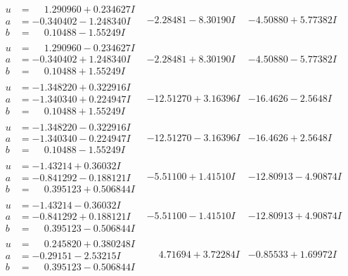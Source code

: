 \documentclass[1p]{elsarticle_modified}
\theoremstyle{definition}
\begin{document}
$$\begin{array}{c|c|c}
\begin{aligned}
u &= \phantom{-}1.290960 + 0.234627 I \\
a &= -0.340402 - 1.248340 I \\
b &= \phantom{-}0.10488 - 1.55249 I\end{aligned}
 & -2.28481 - 8.30190 I & -4.50880 + 5.77382 I \\ \hline\begin{aligned}
u &= \phantom{-}1.290960 - 0.234627 I \\
a &= -0.340402 + 1.248340 I \\
b &= \phantom{-}0.10488 + 1.55249 I\end{aligned}
 & -2.28481 + 8.30190 I & -4.50880 - 5.77382 I \\ \hline\begin{aligned}
u &= -1.348220 + 0.322916 I \\
a &= -1.340340 + 0.224947 I \\
b &= \phantom{-}0.10488 + 1.55249 I\end{aligned}
 & -12.51270 + 3.16396 I & -16.4626 - 2.5648 I \\ \hline\begin{aligned}
u &= -1.348220 - 0.322916 I \\
a &= -1.340340 - 0.224947 I \\
b &= \phantom{-}0.10488 - 1.55249 I\end{aligned}
 & -12.51270 - 3.16396 I & -16.4626 + 2.5648 I \\ \hline\begin{aligned}
u &= -1.43214 + 0.36032 I \\
a &= -0.841292 - 0.188121 I \\
b &= \phantom{-}0.395123 + 0.506844 I\end{aligned}
 & -5.51100 + 1.41510 I & -12.80913 - 4.90874 I \\ \hline\begin{aligned}
u &= -1.43214 - 0.36032 I \\
a &= -0.841292 + 0.188121 I \\
b &= \phantom{-}0.395123 - 0.506844 I\end{aligned}
 & -5.51100 - 1.41510 I & -12.80913 + 4.90874 I \\ \hline\begin{aligned}
u &= \phantom{-}0.245820 + 0.380248 I \\
a &= -0.29151 - 2.53215 I \\
b &= \phantom{-}0.395123 - 0.506844 I\end{aligned}
 & \phantom{-}4.71694 + 3.72284 I & -0.85533 + 1.69972 I \\ \hline\begin{aligned}

\end{aligned}
\end{array}$$
\end{document}
